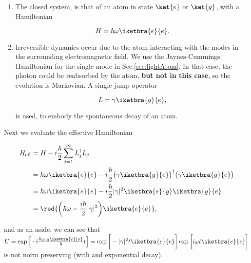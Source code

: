 \begin{enumerate}
\item  The closed  system, is  that of  an atom  in state  $\ket{e}$ or
  $\ket{g}$, with a Hamiltonian

  \begin{equation}
    \label{eqn:exampleH}
    H = \hbar\omega\iketbra{e}{e}.
  \end{equation}

\item Irreversible dynamics occur due  to the atom interacting with the
  modes  in   the  surrounding   electromagnetic  field.  We   use  the
  Jaynes-Cummings    Hamiltonian    for     the    single    mode    in
  Sec.\ref{sec:lightAtom}. In that case, the photon could be reabsorbed
  by  the atom,  \textbf{but not  in this  case}, so  the evolution  is
  Markovian. A single jump operator

  \begin{equation}
    \label{eqn:exampleJump}
    L = \gamma\iketbra{g}{e},
  \end{equation}

  \noindent is used, to embody the spontaneous decay of an atom.
\end{enumerate}

Next we evaluate the effective Hamiltonian

\begin{equation}
  \begin{aligned}
    H_\text{eff} & = H - i\frac{\hbar}{2}\sum_{j=1}^{\infty}L_j^\dagger L_j\\
    & = \hbar\omega\iketbra{e}{e} -i\frac{\hbar}{2}\big(\gamma\iketbra{g}{e}\big)^\dagger\big(\gamma\iketbra{g}{e}\big)\\
    & = \hbar\omega\iketbra{e}{e} -i\frac{\hbar}{2}|\gamma|^2\iketbra{e}{g}\iketbra{g}{e}\\
    &                                                                 =
    \red{\bigg(\hbar\omega-\frac{i\hbar}{2}|\gamma|^2\bigg)\iketbra{e}{e}},
  \end{aligned}
\end{equation}

\noindent     and    as     an     aside,    we     can    see     that
$U                                                                    =
\exp\left[-i\frac{\hbar\omega_\text{eff}\iketbra{e}{e}}{\hbar}t\right]
=           \exp\bigg[-|\gamma|^2t\iketbra{e}{e}\bigg]\exp\bigg[i\omega
t\iketbra{e}{e}\bigg]$  is not  norm preserving  (with and  exponential
decay).

